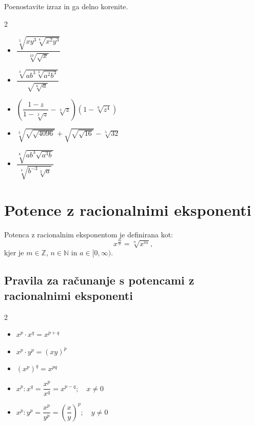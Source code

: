         
            \begin{naloga}
                Poenostavite izraz in ga delno korenite.
                \begin{multicols}{2}
                    \begin{itemize}
                        \item $\displaystyle \dfrac{\sqrt[5]{xy^3\sqrt[4]{x^2y^3}}}{\sqrt[10]{\sqrt{x}}}$ 
                        \item $\displaystyle \dfrac{\sqrt[4]{ab^3\sqrt[3]{a^2b^3}}}{\sqrt{\sqrt[6]{a}}}$ 
                        \item $\displaystyle \left(\dfrac{1-z}{1-\sqrt[3]{z}}-\sqrt[3]{z}\right)\left(1-\sqrt[6]{z^4}\right)$ 
                        \item $\displaystyle \sqrt[3]{\sqrt{\sqrt{4096}}}+\sqrt{\sqrt{\sqrt{16}}}-\sqrt[5]{32}$ 
                        \item $\displaystyle \dfrac{\sqrt[6]{ab^3\sqrt{a^3b}}}{\sqrt[4]{b^{-3}\sqrt[3]{a}}}$ 
                    \end{itemize}
                \end{multicols}
            \end{naloga}
        



            \newpage
    \section{Potence z racionalnimi eksponenti}

        

            Potenca z racionalnim eksponentom je definirana kot: 
                $$\displaystyle x^\frac{m}{n}=\sqrt[n]{x^m},$$
                kjer je $m\in\mathbb{Z}$, $n\in\mathbb{N}$ in $a\in[0,\infty)$.
            

            \subsection*{Pravila za računanje s potencami z racionalnimi eksponenti}
                \begin{multicols}{2}
                    \begin{itemize}
                        \item $\displaystyle x^p\cdot x^q=x^{p+q}$
                        \item $\displaystyle x^p\cdot y^p=(xy)^p$
                        \item $\displaystyle \left(x^p\right)^q=x^{pq}$
                        \item $\displaystyle x^p:x^q=\dfrac{x^p}{x^q}=x^{p-q}; \quad x\neq 0$
                        \item $\displaystyle x^p:y^p=\dfrac{x^p}{y^p}=\left(\dfrac{x}{y}\right)^p; \quad y\neq 0$
                    \end{itemize}
                \end{multicols}
                
